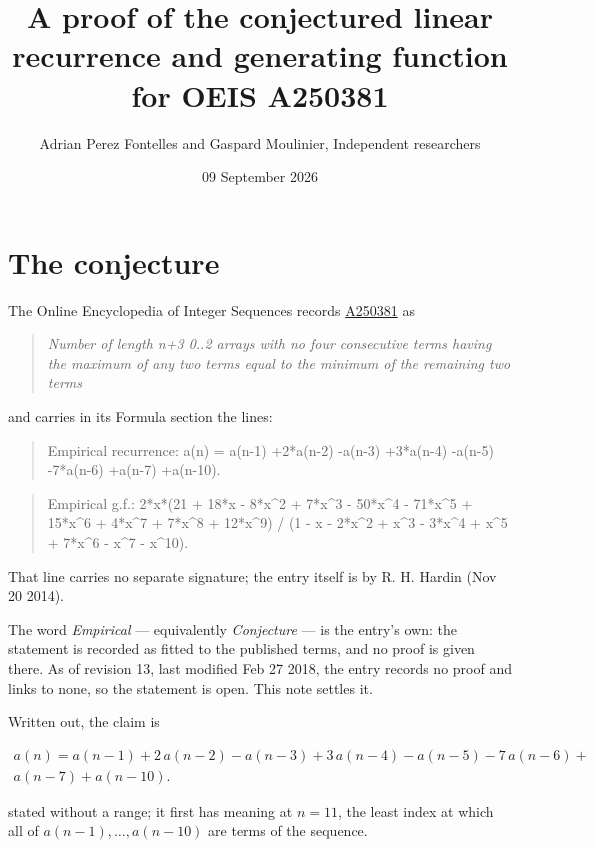 \documentclass[11pt]{article}
\title{A proof of the conjectured linear recurrence and generating function for OEIS A250381}
\author{Adrian Perez Fontelles and Gaspard Moulinier, Independent researchers}
\date{09 September 2026}
\theoremstyle{definition}
\begin{document}
\maketitle
\section{The conjecture}

The Online Encyclopedia of Integer Sequences records \href{https://oeis.org/A250381}{A250381} as

\begin{quote}\itshape Number of length n+3 0..2 arrays with no four consecutive terms having the maximum of any two terms equal to the minimum of the remaining two terms\end{quote}

and carries in its Formula section the lines:

\begin{quote}\ttfamily Empirical recurrence: a(n) = a(n-1) +2*a(n-2) -a(n-3) +3*a(n-4) -a(n-5) -7*a(n-6) +a(n-7) +a(n-10).\end{quote}

\begin{quote}\ttfamily Empirical g.f.: 2*x*(21 + 18*x - 8*x\textasciicircum{}2 + 7*x\textasciicircum{}3 - 50*x\textasciicircum{}4 - 71*x\textasciicircum{}5 + 15*x\textasciicircum{}6 + 4*x\textasciicircum{}7 + 7*x\textasciicircum{}8 + 12*x\textasciicircum{}9) / (1 - x - 2*x\textasciicircum{}2 + x\textasciicircum{}3 - 3*x\textasciicircum{}4 + x\textasciicircum{}5 + 7*x\textasciicircum{}6 - x\textasciicircum{}7 - x\textasciicircum{}10).\end{quote}

That line carries no separate signature; the entry itself is by R. H. Hardin (Nov 20 2014).

The word {\itshape Empirical} --- equivalently {\itshape Conjecture} --- is the entry's own: the statement is recorded as fitted to the published terms, and no proof is given there. As of revision 13, last modified Feb 27 2018, the entry records no proof and links to none, so the statement is open. This note settles it.

Written out, the claim is

\begin{multline*} a(n) = a(n-1) + 2\,a(n-2) - a(n-3) + 3\,a(n-4) - a(n-5) - 7\,a(n-6) + \\ a(n-7) + a(n-10). \end{multline*}

stated without a range; it first has meaning at $n = 11$, the least index at which all of $a(n-1),\dots,a(n-10)$ are terms of the sequence.
\end{document}
